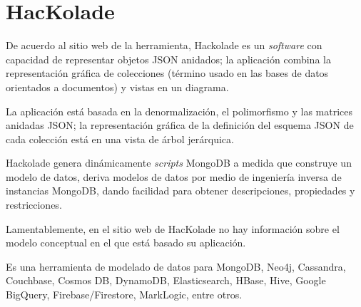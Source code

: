 \section{HacKolade}
De acuerdo al sitio web de la herramienta\cite{hackolade_hackolade_2020}, Hackolade es un \textit{software} con capacidad de representar objetos JSON anidados; la aplicación combina la representación gráfica de colecciones (término usado en las bases de datos orientados a documentos) y vistas en un diagrama.


La aplicación está basada en la denormalización, el polimorfismo y las matrices anidadas JSON; la representación gráfica de la definición del esquema JSON de cada colección está en una vista de árbol jerárquica. 


Hackolade genera dinámicamente \textit{scripts} MongoDB a medida que construye un modelo de datos, deriva modelos de datos por medio de ingeniería inversa de instancias MongoDB, dando facilidad para obtener descripciones, propiedades y restricciones.


Lamentablemente, en el sitio web de HacKolade no hay información sobre el modelo conceptual en el que está basado su aplicación.


Es una herramienta de modelado de datos para MongoDB, Neo4j, Cassandra, Couchbase, Cosmos DB, DynamoDB, Elasticsearch, HBase, Hive, Google BigQuery, Firebase/Firestore, MarkLogic, entre otros.
